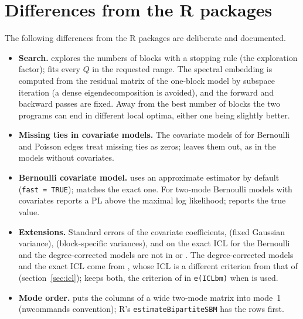 \section{Differences from the R packages}\label{sec:dev}
The following differences from the R packages are deliberate and documented.
\begin{itemize}
\item \textbf{Search.} \blockmodels{} explores the numbers of blocks with a stopping rule (the exploration factor); \nwsbm{} fits every $Q$ in the requested range. The spectral embedding is computed from the residual matrix of the one-block model by subspace iteration (a dense eigendecomposition is avoided), and the forward and backward passes are fixed. Away from the best number of blocks the two programs can end in different local optima, either one being slightly better.
\item \textbf{Missing ties in covariate models.} The covariate models of \blockmodels{} for Bernoulli and Poisson edges treat missing ties as zeros; \nwsbm{} leaves them out, as in the models without covariates.
\item \textbf{Bernoulli covariate model.} \sbmR{} uses an approximate estimator by default (\texttt{fast = TRUE}); \nwsbm{} matches the exact one. For two-mode Bernoulli models with covariates \blockmodels{} reports a PL above the maximal log likelihood; \nwsbm{} reports the true value.
\item \textbf{Extensions.} Standard errors of the covariate coefficients,  (fixed Gaussian variance),  (block-specific variances),  and  on the exact ICL for the Bernoulli and the degree-corrected models are not in \blockmodels{} or \sbmR{}. The degree-corrected models and the exact ICL come from \greed{}, whose ICL is a different criterion from that of \blockmodels{} (section~\ref{sec:icl}); \nwsbm{} keeps both, the criterion of \blockmodels{} in \texttt{e(ICLbm)} when  is used.
\item \textbf{Mode order.} \nwsbm{} puts the columns of a wide two-mode matrix into mode~1 (nwcommands convention); R's \texttt{estimateBipartiteSBM} has the rows first.
\end{itemize}

